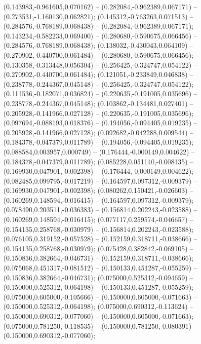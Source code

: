  (0.143983,-0.961605,0.070162) -- (0.282084,-0.962389,0.067171) -- (0.273531,-1.160130,0.062821);
 (0.145312,-0.763263,0.071513) -- (0.284576,-0.768189,0.068438) -- (0.282084,-0.962389,0.067171);
 (0.143234,-0.582233,0.069400) -- (0.280680,-0.590675,0.066456) -- (0.284576,-0.768189,0.068438);
 (0.138032,-0.430043,0.064109) -- (0.270902,-0.440700,0.061484) -- (0.280680,-0.590675,0.066456);
 (0.130358,-0.313448,0.056304) -- (0.256425,-0.324747,0.054122) -- (0.270902,-0.440700,0.061484);
 (0.121051,-0.233849,0.046838) -- (0.238778,-0.244367,0.045148) -- (0.256425,-0.324747,0.054122);
 (0.111536,-0.182071,0.036824) -- (0.220635,-0.191005,0.035696) -- (0.238778,-0.244367,0.045148);
 (0.103862,-0.134481,0.027401) -- (0.205928,-0.141966,0.027128) -- (0.220635,-0.191005,0.035696);
 (0.097694,-0.088193,0.018376) -- (0.194056,-0.094405,0.019235) -- (0.205928,-0.141966,0.027128);
 (0.092682,-0.042288,0.009544) -- (0.184378,-0.047379,0.011789) -- (0.194056,-0.094405,0.019235);
 (0.088584,0.003957,0.000749) -- (0.176444,-0.000149,0.004622) -- (0.184378,-0.047379,0.011789);
 (0.085228,0.051140,-0.008135) -- (0.169930,0.047901,-0.002398) -- (0.176444,-0.000149,0.004622);
 (0.082485,0.099795,-0.017219) -- (0.164597,0.097312,-0.009379) -- (0.169930,0.047901,-0.002398);
 (0.080262,0.150421,-0.026603) -- (0.160269,0.148594,-0.016415) -- (0.164597,0.097312,-0.009379);
 (0.078490,0.203511,-0.036383) -- (0.156814,0.202243,-0.023588) -- (0.160269,0.148594,-0.016415);
 (0.077117,0.259574,-0.046657) -- (0.154135,0.258768,-0.030979) -- (0.156814,0.202243,-0.023588);
 (0.076105,0.319152,-0.057528) -- (0.152159,0.318711,-0.038666) -- (0.154135,0.258768,-0.030979);
 (0.075428,0.382842,-0.069105) -- (0.150836,0.382664,-0.046731) -- (0.152159,0.318711,-0.038666);
 (0.075068,0.451317,-0.081512) -- (0.150133,0.451287,-0.055259) -- (0.150836,0.382664,-0.046731);
 (0.075000,0.525312,-0.094659) -- (0.150000,0.525312,-0.064198) -- (0.150133,0.451287,-0.055259);
 (0.075000,0.605000,-0.105666) -- (0.150000,0.605000,-0.071663) -- (0.150000,0.525312,-0.064198);
 (0.075000,0.690312,-0.113624) -- (0.150000,0.690312,-0.077060) -- (0.150000,0.605000,-0.071663);
 (0.075000,0.781250,-0.118535) -- (0.150000,0.781250,-0.080391) -- (0.150000,0.690312,-0.077060);
